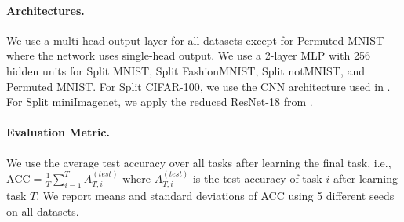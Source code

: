 

\vspace{-3mm}
\paragraph{Architectures.} We use a multi-head output layer for all datasets except for Permuted MNIST where the network uses single-head output. We use a 2-layer MLP with 256 hidden units for Split MNIST, Split FashionMNIST, Split notMNIST, and Permuted MNIST. For Split CIFAR-100, we use the CNN architecture used in . For Split miniImagenet, we apply the reduced ResNet-18 from . 

\vspace{-3mm}
\paragraph{Evaluation Metric.} We use the average test accuracy over all tasks after learning the final task, i.e., $\text{ACC} = \frac{1}{T} \sum_{i=1}^{T} A_{T, i}^{(test)}$ where $A_{T, i}^{(test)}$ is the test accuracy of task $i$ after learning task $T$. We report means and standard deviations of ACC using 5 different seeds on all datasets. 











%















